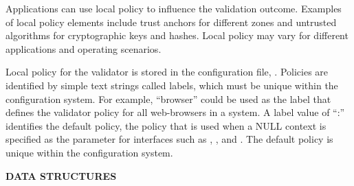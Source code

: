 Applications can use local policy to influence the validation outcome.
Examples of local policy elements include trust anchors for different zones
and untrusted algorithms for cryptographic keys and hashes.  Local policy may
vary for different applications and operating scenarios.

Local policy for the validator is stored in the configuration file,
.  Policies are identified by simple text strings
called labels, which must be unique within the configuration system.  For
example, ``browser'' could be used as the label that defines the validator
policy for all web-browsers in a system.  A label value of ``:'' identifies
the default policy, the policy that is used when a NULL context is specified
as the  parameter for interfaces such as
, , and
.  The default policy is unique within the
configuration system.

{\bf DATA STRUCTURES}

